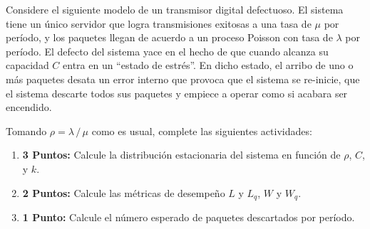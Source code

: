 \documentclass[ a4paper, twoside, 11pt]{article}
\begin{document}
\begin{problem}
\label{prob:arribo-geometrico-prima}
Considere el siguiente modelo de un transmisor digital defectuoso. El sistema tiene un \'unico servidor que logra transmisiones exitosas a una tasa de $\mu$ por per\'iodo, y los paquetes llegan de acuerdo a un proceso Poisson con tasa de $\lambda$ por per\'iodo. El defecto del sistema yace en el hecho de que cuando alcanza su capacidad $C$ entra en un ``estado de estr\'es''. En dicho estado, el arribo de uno o m\'as paquetes desata un error interno que provoca que el sistema se re-inicie, \ie que el sistema descarte todos sus paquetes y empiece a operar como si acabara ser encendido. 

\begin{figure}[htb]
\centering
\def\svgwidth{0.9\columnwidth}

\end{figure}
\halfskip

Tomando $\rho = \lambda \, / \, \mu$ como es usual, complete las siguientes actividades: 
\begin{enumerate}[label=\textbf{\alph*)}]
\item \textbf{3 Puntos:} Calcule la distribuci\'on estacionaria del sistema en funci\'on de $\rho$, $C$, y $k$. 
\item \textbf{2 Puntos:} Calcule las m\'etricas de desempe\~no $L$ y $L_q$, $W$ y $W_q$. 
\item \textbf{1 Punto:} Calcule el n\'umero esperado de paquetes descartados por per\'iodo. 
\end{enumerate}

\end{problem}
\fullskip
\end{document}
